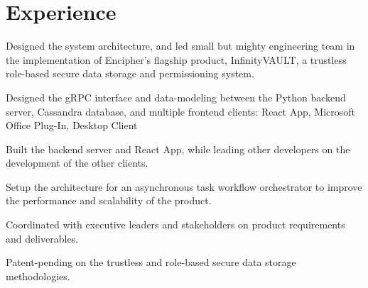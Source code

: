 \documentclass[letterpaper]{deedy-resume-openfont} %
\begin{document}

\lastupdated %


\section{Experience}
\sectionheadersep


\begin{tightemize}
\item Designed the system architecture, and led small but mighty engineering team in the implementation of Encipher's flagship product, InfinityVAULT, a trustless role-based secure data storage and permissioning system.
\item Designed the gRPC interface and data-modeling between the Python backend server, Cassandra database, and multiple frontend clients: React App, Microsoft Office Plug-In, Desktop Client
\item Built the backend server and React App, while leading other developers on the development of the other clients. 
\item Setup the architecture for an asynchronous task workflow orchestrator to improve the performance and scalability of the product.
\item Coordinated with executive leaders and stakeholders on product requirements and deliverables.
\item Patent-pending on the trustless and role-based secure data storage methodologies.
\end{tightemize}

\sectionsep %

\end{document}
